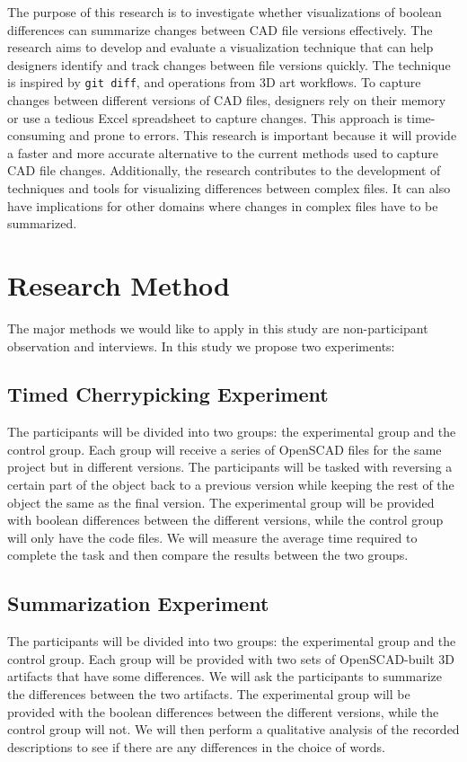 \documentclass[sigconf,authorversion,nonacm]{acmart}
\begin{document}
The purpose of this research is to investigate whether visualizations of boolean differences can summarize changes between CAD file versions effectively. The research aims to develop and evaluate a visualization technique that can help designers identify and track changes between file versions quickly. The technique is inspired by \texttt{git diff}, and operations from 3D art workflows. To capture changes between different versions of CAD files, designers rely on their memory or use a tedious Excel spreadsheet to capture changes. This approach is time-consuming and prone to errors. This research is important because it will provide a faster and more accurate alternative to the current methods used to capture CAD file changes. Additionally, the research contributes to the development of techniques and tools for visualizing differences between complex files. It can also have implications for other domains where changes in complex files have to be summarized.

\section{Research Method}

The major methods we would like to apply in this study are non-participant observation and interviews. In this study we propose two experiments:

\subsection{Timed Cherrypicking Experiment}
The participants will be divided into two groups: the experimental group and the control group. Each group will receive a series of OpenSCAD files for the same project but in different versions. The participants will be tasked with reversing a certain part of the object back to a previous version while keeping the rest of the object the same as the final version. The experimental group will be provided with boolean differences between the different versions, while the control group will only have the code files. We will measure the average time required to complete the task and then compare the results between the two groups.

\subsection{Summarization Experiment}
The participants will be divided into two groups: the experimental group and the control group. Each group will be provided with two sets of OpenSCAD-built 3D artifacts that have some differences. We will ask the participants to summarize the differences between the two artifacts. The experimental group will be provided with the boolean differences between the different versions, while the control group will not. We will then perform a qualitative analysis of the recorded descriptions to see if there are any differences in the choice of words.
\end{document}
